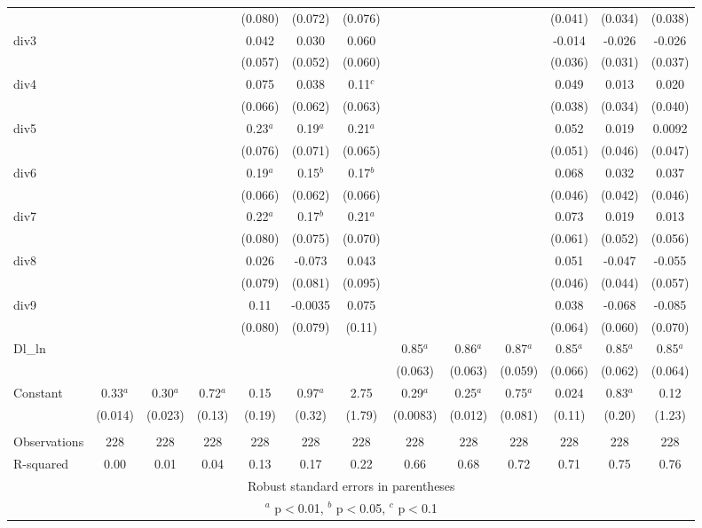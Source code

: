 \documentclass[]{article}
\begin{document}
\begin{tabular}{lcccccccccccc}
 &  &  &  & (0.080) & (0.072) & (0.076) &  &  &  & (0.041) & (0.034) & (0.038) \\
div3 &  &  &  & 0.042 & 0.030 & 0.060 &  &  &  & -0.014 & -0.026 & -0.026 \\
 &  &  &  & (0.057) & (0.052) & (0.060) &  &  &  & (0.036) & (0.031) & (0.037) \\
div4 &  &  &  & 0.075 & 0.038 & 0.11$^c$ &  &  &  & 0.049 & 0.013 & 0.020 \\
 &  &  &  & (0.066) & (0.062) & (0.063) &  &  &  & (0.038) & (0.034) & (0.040) \\
div5 &  &  &  & 0.23$^a$ & 0.19$^a$ & 0.21$^a$ &  &  &  & 0.052 & 0.019 & 0.0092 \\
 &  &  &  & (0.076) & (0.071) & (0.065) &  &  &  & (0.051) & (0.046) & (0.047) \\
div6 &  &  &  & 0.19$^a$ & 0.15$^b$ & 0.17$^b$ &  &  &  & 0.068 & 0.032 & 0.037 \\
 &  &  &  & (0.066) & (0.062) & (0.066) &  &  &  & (0.046) & (0.042) & (0.046) \\
div7 &  &  &  & 0.22$^a$ & 0.17$^b$ & 0.21$^a$ &  &  &  & 0.073 & 0.019 & 0.013 \\
 &  &  &  & (0.080) & (0.075) & (0.070) &  &  &  & (0.061) & (0.052) & (0.056) \\
div8 &  &  &  & 0.026 & -0.073 & 0.043 &  &  &  & 0.051 & -0.047 & -0.055 \\
 &  &  &  & (0.079) & (0.081) & (0.095) &  &  &  & (0.046) & (0.044) & (0.057) \\
div9 &  &  &  & 0.11 & -0.0035 & 0.075 &  &  &  & 0.038 & -0.068 & -0.085 \\
 &  &  &  & (0.080) & (0.079) & (0.11) &  &  &  & (0.064) & (0.060) & (0.070) \\
Dl\_ln &  &  &  &  &  &  & 0.85$^a$ & 0.86$^a$ & 0.87$^a$ & 0.85$^a$ & 0.85$^a$ & 0.85$^a$ \\
 &  &  &  &  &  &  & (0.063) & (0.063) & (0.059) & (0.066) & (0.062) & (0.064) \\
Constant & 0.33$^a$ & 0.30$^a$ & 0.72$^a$ & 0.15 & 0.97$^a$ & 2.75 & 0.29$^a$ & 0.25$^a$ & 0.75$^a$ & 0.024 & 0.83$^a$ & 0.12 \\
 & (0.014) & (0.023) & (0.13) & (0.19) & (0.32) & (1.79) & (0.0083) & (0.012) & (0.081) & (0.11) & (0.20) & (1.23) \\
 &  &  &  &  &  &  &  &  &  &  &  &  \\
Observations & 228 & 228 & 228 & 228 & 228 & 228 & 228 & 228 & 228 & 228 & 228 & 228 \\
 R-squared & 0.00 & 0.01 & 0.04 & 0.13 & 0.17 & 0.22 & 0.66 & 0.68 & 0.72 & 0.71 & 0.75 & 0.76 \\ \hline
\multicolumn{13}{c}{ Robust standard errors in parentheses} \\
\multicolumn{13}{c}{ $^a$ p$<$0.01, $^b$ p$<$0.05, $^c$ p$<$0.1} \\
\end{tabular}
\end{document}
